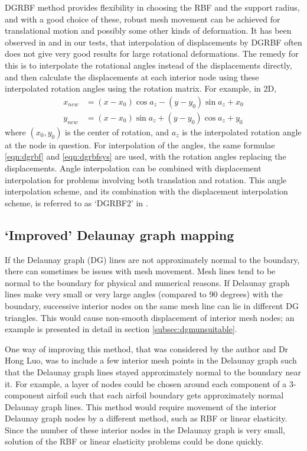  DGRBF method provides flexibility in choosing the RBF and the support radius, and with a good choice of these, robust mesh movement can be achieved for translational motion and possibly some other kinds of deformation. It has been observed in \cite{mm:dgrbf} and in our tests, that interpolation of displacements by DGRBF often does not give very good results for large rotational deformations. The remedy for this is to interpolate the rotational angles instead of the displacements directly, and then calculate the displacements at each interior node using these interpolated rotation angles using the rotation matrix. For example, in 2D,
 \begin{align}
 x_{new} &= (x-x_0)\cos a_z - (y-y_0)\sin a_z + x_0 \\
 y_{new} &= (x-x_0)\sin a_z + (y-y_0)\cos a_z + y_0
 \end{align}
 where $(x_0,y_0)$ is the center of rotation, and $a_z$ is the interpolated rotation angle at the node in question. For interpolation of the angles, the same formulae \eqref{eqn:dgrbf} and \eqref{eqn:dgrbfsys} are used, with the rotation angles replacing the displacements. Angle interpolation can be combined with displacement interpolation for problems involving both translation and rotation. This angle interpolation scheme, and its combination with the displacement interpolation scheme, is referred to as `DGRBF2' in \cite{mm:dgrbf}.
 
 \subsection{`Improved' Delaunay graph mapping}
 \label{sec:hybriddg}
 If the Delaunay graph (DG) lines are not approximately normal to the boundary, there can sometimes be issues with mesh movement. Mesh lines tend to be normal to the boundary for physical and numerical reasons. If Delaunay graph lines make very small or very large angles (compared to 90 degrees) with the boundary, successive interior nodes on the same mesh line can lie in different DG triangles. This would cause non-smooth displacement of interior mesh nodes; an example is presented in detail in section \ref{subsec:dgmunsuitable}.
 
 One way of improving this method, that was considered by the author and Dr Hong Luo, was to include a few interior mesh points in the Delaunay graph such that the Delaunay graph lines stayed approximately normal to the boundary near it. For example, a layer of nodes could be chosen around each component of a 3-component airfoil such that each airfoil boundary gets approximately normal Delaunay graph lines. This method would require movement of the interior Delaunay graph nodes by a different method, such as RBF or linear elasticity. Since the number of these interior nodes in the Delaunay graph is very small, solution of the RBF or linear elasticity problems could be done quickly.
 
